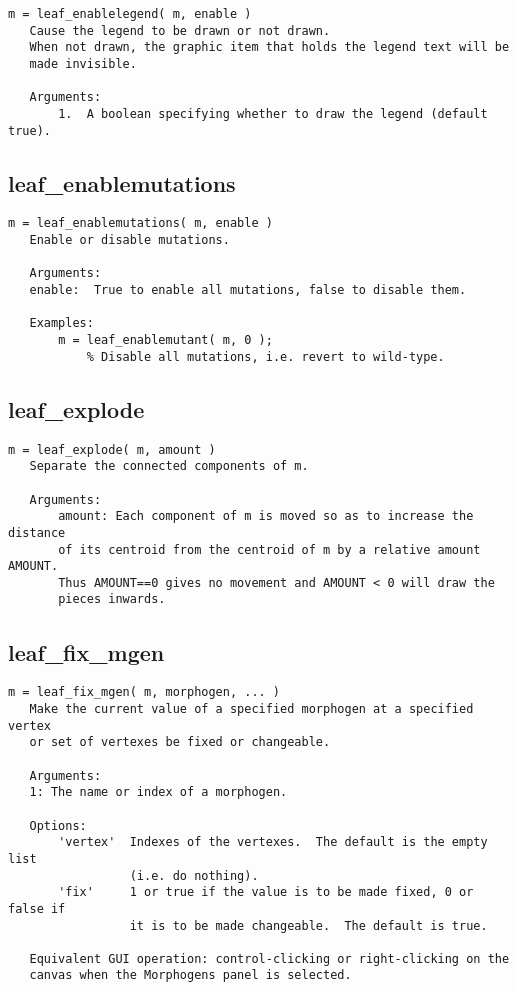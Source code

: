 \begin{verbatim}
m = leaf_enablelegend( m, enable )
   Cause the legend to be drawn or not drawn.
   When not drawn, the graphic item that holds the legend text will be
   made invisible.

   Arguments:
       1.  A boolean specifying whether to draw the legend (default true).
\end{verbatim}

\subsection{leaf\_enablemutations}\label{section-leaf-enablemutations}

\begin{verbatim}
m = leaf_enablemutations( m, enable )
   Enable or disable mutations.

   Arguments:
   enable:  True to enable all mutations, false to disable them.

   Examples:
       m = leaf_enablemutant( m, 0 );
           % Disable all mutations, i.e. revert to wild-type.
\end{verbatim}

\subsection{leaf\_explode}\label{section-leaf-explode}

\begin{verbatim}
m = leaf_explode( m, amount )
   Separate the connected components of m.

   Arguments:
       amount: Each component of m is moved so as to increase the distance
       of its centroid from the centroid of m by a relative amount AMOUNT.
       Thus AMOUNT==0 gives no movement and AMOUNT < 0 will draw the
       pieces inwards.
\end{verbatim}

\subsection{leaf\_fix\_mgen}\label{section-leaf-fix-mgen}

\begin{verbatim}
m = leaf_fix_mgen( m, morphogen, ... )
   Make the current value of a specified morphogen at a specified vertex
   or set of vertexes be fixed or changeable.

   Arguments:
   1: The name or index of a morphogen.

   Options:
       'vertex'  Indexes of the vertexes.  The default is the empty list
                 (i.e. do nothing).
       'fix'     1 or true if the value is to be made fixed, 0 or false if
                 it is to be made changeable.  The default is true.

   Equivalent GUI operation: control-clicking or right-clicking on the
   canvas when the Morphogens panel is selected.
\end{verbatim}

